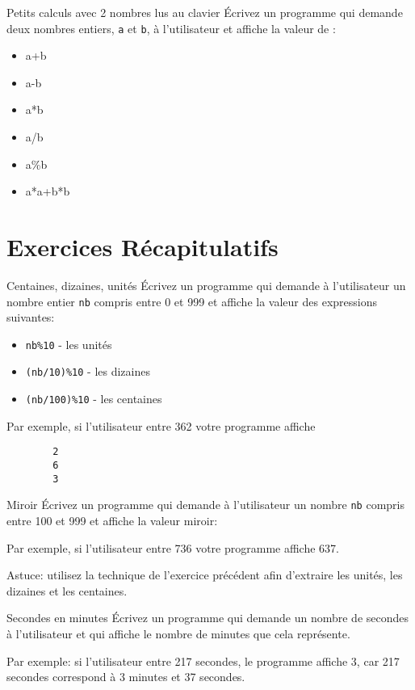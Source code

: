 \documentclass[a4paper,11pt]{article}
\begin{document}
	\begin{Exercice}{Petits calculs avec 2 nombres lus au clavier} 
		\'Ecrivez un programme qui demande 
		deux nombres entiers, \texttt{a} et \texttt{b}, à l'utilisateur et affiche la 
		valeur de :
		\begin{itemize}
		 	\item a+b
			\item a-b
			\item a*b
			\item a/b
			\item a\%b
			\item a*a+b*b
		\end{itemize} 
	\end{Exercice}


\section{Exercices Récapitulatifs}

		
	\begin{Exercice}{Centaines, dizaines, unités} 
		\'Ecrivez un programme qui demande à l'utilisateur 
		un nombre entier \texttt{nb} compris entre 0 et 999 et affiche la valeur des 
		expressions suivantes:
		\begin{itemize}
			\item \texttt{nb\%10} - les unités
			\item \texttt{(nb/10)\%10} - les dizaines
			\item \texttt{(nb/100)\%10} - les centaines
		\end{itemize}
		Par exemple, si l'utilisateur entre 362 votre programme affiche
		\begin{verbatim}
		2
		6
		3
		\end{verbatim}
	\end{Exercice}	

	\begin{Exercice}{Miroir} 
		\'Ecrivez un programme qui demande à l'utilisateur 
		un nombre \texttt{nb} compris entre 100 et 999 et affiche la valeur miroir:

		Par exemple, si l'utilisateur entre 736 votre programme affiche 637.
		
		Astuce: utilisez la technique de l'exercice précédent afin d'extraire les
		unités, les dizaines et les centaines.
	\end{Exercice}	

	
	\begin{Exercice}{Secondes en minutes} 
		\'Ecrivez un programme qui demande un nombre de secondes à l'utilisateur
		et qui affiche le nombre de minutes que cela représente.

		Par exemple: 
		si l'utilisateur entre 217 secondes, le programme affiche 3, 
		car 217 secondes correspond à 3 minutes et 37 secondes.
	\end{Exercice}
\end{document}

